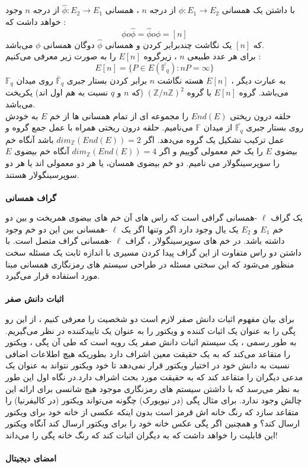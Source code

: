 \documentclass[12pt,a4paper]{book}
\begin{document}
با داشتن یک همسانی 
$\phi : E_1 \rightarrow E_2$
از درجه 
$n$
، همسانی 
$\hat{\phi} : E_2 \rightarrow E_1$
از درجه
$n$
وجود خواهد داشت که :
$$\phi o \hat{\phi} = \hat{\phi} o \phi = [n]$$
که 
$[n]$
یک نگاشت چندبرابر کردن و همسانی
$\hat{\phi}$
دوگان همسانی
$\phi$
می‌باشد.
\\
برای هر عدد طبیعی 
$n$
، زیرگروه 
$E[n]$
را به صورت زیر معرفی می‌کنیم :
$$ E[n] = \{ P \in E(\bar{\mathbb{F}_{q}})  : nP = \infty \} $$
به عبارت دیگر ، 
$E[n]$
هسته نگاشت 
$n$
برابر کردن بستار جبری 
$\bar{\mathbb{F}}_q$
روی میدان 
$\mathbb{F}_q$
می‌باشد.
گروه
$E[n]$
با گروه
$(\mathbb{Z} / n\mathbb{Z})^2$
(که 
$n$
و
$q$
نسبت به هم اول اند) یکریخت می‌باشد.
\\
حلقه درون ریختی 
$End(E)$
را مجموعه ای از تمام همسانی ها از خم
$E$
به خودش روی بستار جبری 
$\bar{\mathbb{F}_q}$
از میدان
$\mathbb{F}$
می‌نامیم.
حلقه درون ریختی همراه با عمل جمع گروه  و عمل ترکیب تشکیل یک گروه می‌دهد. اگر
$dim_{\mathbb{Z}}(End(E)) = 2 $
باشد آنگاه خم بیضوی
$E$
را یک خم معمولی گوییم و اگر 
$dim_{\mathbb{Z}}(End(E)) = 4 $
آنگاه خم بیضوی 
$E$
را سوپرسینگولار می نامیم.
دو خم بیضوی همسان، یا هر دو معمولی اند یا هر دو سوپرسینگولار هستند.
\\
\\
\textbf{گراف همسانی}

یک گراف
$\ell$
-همسانی گرافی است که راس های آن خم های بیضوی همریخت و بین دو خم 
$E_1$
و
$E_2$ 
یک یال وجود دارد اگر وتنها اگر یک 
$\ell$
-همسانی بین این دو خم وجود داشته باشد. در خم های سوپرسینگولار ، گراف 
$\ell$
-همسانی گراف متصل است. با داشتن دو راس متفاوت از این گراف پیدا کردن مسیری با اندازه ثابت یک مسئله سخت منظور می‌شود که این سختی مسئله در طراحی سیستم های رمزنگاری همسانی مبنا مورد استفاده قرار می‌گیرد.
\\
\\
\textbf{اثبات دانش صفر}


برای بیان مفهوم اثبات دانش صفر لازم است دو شخصیت را معرفی کنیم ، از این رو پگی را 
به عنوان یک اثبات کننده 
و ویکتور را
به عنوان یک تاییدکننده در نظر می‌گیریم.
به طور رسمی ، یک سیستم اثبات دانش صفر یک رویه است که طی آن پگی  ، ویکتور را متقاعد می‌کند که به یک حقیقت معین اشراف دارد  بطوریکه هیچ اطلاعات اضافی نسبت به دانش خود در اختیار ویکتور قرار نمی‌دهد تا خود ویکتور نتواند به عنوان یک مدعی دیگران را متقاعد کند که به حقیقت مورد بحث اشراف دارد.در نگاه اول این طور به نظر می‌رسد که با داشتن سیستم های رمزنگاری موجود هیچ شانسی برای ارائه این چالش وجود ندارد. برای مثال پگی (در نیویورک) چگونه می‌تواند ویکتور (در کالیفرنیا) را متقاعد سازد که رنگ خانه اش قرمز است بدون اینکه عکسی از خانه خود برای ویکتور ارسال کند؟ و همچنین اگر پگی عکس خانه خود را برای ویکتور ارسال کند آنگاه ویکتور این قابلیت را خواهد داشت که به دیگران اثبات کند که رنگ خانه پگی را می‌داند!
\\
\\
\textbf{امضای دیجیتال}
\end{document}
